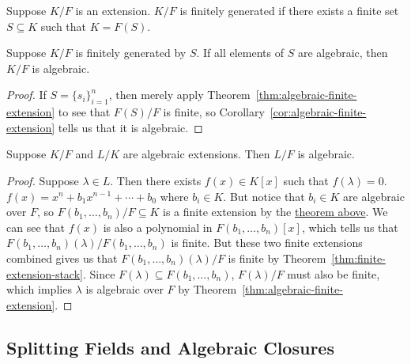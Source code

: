 \begin{definition}
    Suppose \(K/F\) is an extension.
    \(K/F\) is finitely generated if there exists a finite set \(S \subseteq K\)
    such that \(K = F(S)\).
\end{definition}
\begin{theorem}\label{thm:finitely-gen-algebraic}
    Suppose \(K/F\) is finitely generated by \(S\).
    If all elements of \(S\) are algebraic, then \(K/F\) is algebraic.
\end{theorem}
\begin{proof}
    If \(S = {\{s_i\}}_{i=1}^n\),
    then merely apply Theorem~\ref{thm:algebraic-finite-extension}
    to see that \(F(S)/F\) is finite,
    so Corollary~\ref{cor:algebraic-finite-extension}
    tells us that it is algebraic.
\end{proof}
\begin{corollary}\label{cor:algebraic-extension-stack}
    Suppose \(K/F\) and \(L/K\) are algebraic extensions.
    Then \(L/F\) is algebraic.
\end{corollary}
\begin{proof}
    Suppose \(\lambda \in L\).
    Then there exists \(f(x) \in K[x]\) such that \(f(\lambda) = 0\).
    \(f(x) = x^n + b_1 x^{n-1} + \cdots + b_0\) where \(b_i \in K\).
    But notice that \(b_i \in K\) are algebraic over \(F\),
    so \(F(b_1,\hdots,b_n)/F \subseteq K\) is a finite extension
    by the \hyperref[thm:finitely-gen-algebraic]{theorem above}.
    We can see that \(f(x)\) is also a polynomial in \(F(b_1,\hdots,b_n)[x]\),
    which tells us that \(F(b_1,\hdots,b_n)(\lambda)/F(b_1,\hdots,b_n)\) is finite.
    But these two finite extensions combined gives us that
    \(F(b_1,\hdots,b_n)(\lambda)/F\) is finite by Theorem~\ref{thm:finite-extension-stack}.
    Since \(F(\lambda) \subseteq F(b_1,\hdots,b_n)\),
    \(F(\lambda)/F\) must also be finite,
    which implies \(\lambda\) is algebraic over \(F\)
    by Theorem~\ref{thm:algebraic-finite-extension}.
\end{proof}


\subsection{Splitting Fields and Algebraic Closures}

